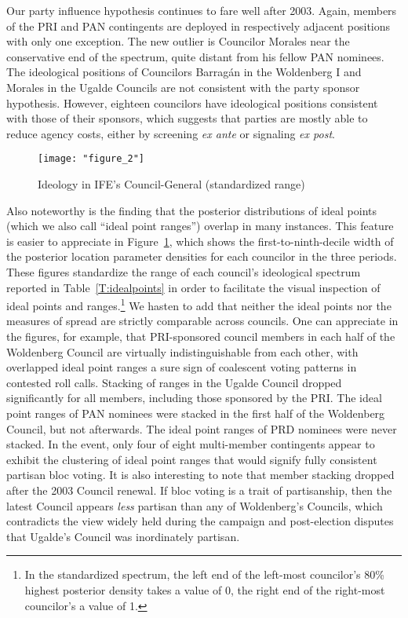 \documentclass[12 pt, letter]{article}
\begin{document}
Our party influence hypothesis continues to fare well after 2003.
Again, members of the PRI and PAN contingents are deployed in
respectively adjacent positions with only one exception.  The new
outlier is Councilor Morales near the conservative end of the
spectrum, quite distant from his fellow PAN nominees. The
ideological positions of Councilors Barrag\'an in the Woldenberg I
and Morales in the Ugalde Councils are not consistent with the party
sponsor hypothesis. However, eighteen councilors have ideological
positions consistent with those of their sponsors, which suggests
that parties are mostly able to reduce agency costs, either by
screening \emph{ex ante} or signaling \emph{ex post}.

\begin{figure}
\begin{center}
  \caption{Ideology in IFE's Council-General (standardized range)}\label{F:ideolbars}
  \texttt{[image: "figure\_2"]}
\end{center}
\end{figure}

Also noteworthy is the finding that the posterior distributions of
ideal points (which we also call ``ideal point ranges'') overlap in
many instances.  This feature is easier to appreciate in
Figure~\ref{F:ideolbars}, which shows the first-to-ninth-decile
width of the posterior location parameter densities for each
councilor in the three periods. These figures standardize the range
of each council's ideological spectrum reported in
Table~\ref{T:idealpoints} in order to facilitate the visual
inspection of ideal points and ranges.\footnote{In the standardized
spectrum, the left end of the left-most councilor's 80\% highest
posterior density takes a value of 0, the right end of the
right-most councilor's a value of 1.}  We hasten to add that neither
the ideal points nor the measures of spread are strictly comparable
across councils.  One can appreciate in the figures, for example,
that PRI-sponsored council members in each half of the Woldenberg
Council are virtually indistinguishable from each other, with
overlapped ideal point ranges a sure sign of coalescent voting
patterns in contested roll calls. Stacking of ranges in the Ugalde
Council dropped significantly for all members, including those
sponsored by the PRI.  The ideal point ranges of PAN nominees were
stacked in the first half of the Woldenberg Council, but not
afterwards. The ideal point ranges of PRD nominees  were never
stacked. In the event, only four of eight multi-member contingents
appear to exhibit the clustering of ideal point ranges that would
signify fully consistent partisan bloc voting.  It is also
interesting to note that member stacking dropped after the 2003
Council renewal. If bloc voting is a trait of partisanship, then the
latest Council appears \emph{less} partisan than any of Woldenberg's
Councils, which contradicts the view widely held during the campaign
and post-election disputes that Ugalde's Council was inordinately
partisan.
\end{document}
